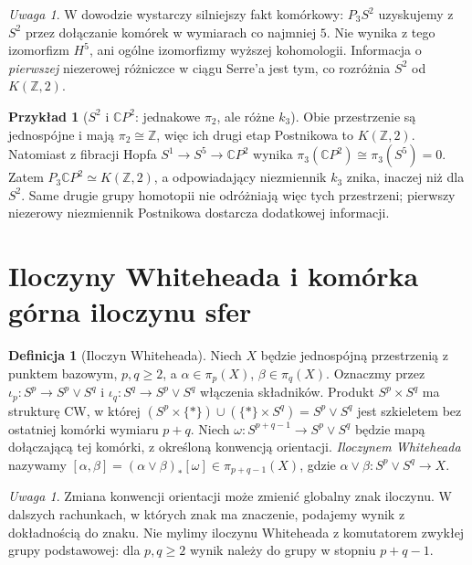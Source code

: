 \documentclass[11pt,a4paper,oneside]{report}
\newcommand{\C}{\mathbb{C}}
\newcommand{\Z}{\mathbb{Z}}
\theoremstyle{plain}
\theoremstyle{definition}
\newtheorem{definicja}[twierdzenie]{Definicja}
\newtheorem{przyklad}[twierdzenie]{Przykład}
\theoremstyle{remark}
\newtheorem{uwaga}[twierdzenie]{Uwaga}
\begin{document}
\begin{uwaga}
W dowodzie wystarczy silniejszy fakt komórkowy:
$P_3S^2$ uzyskujemy z $S^2$ przez dołączanie komórek
w wymiarach co najmniej $5$. Nie wynika z tego
izomorfizm $H^5$, ani ogólne izomorfizmy wyższej
kohomologii. Informacja o \emph{pierwszej} niezerowej
różniczce w ciągu Serre'a jest tym, co rozróżnia
$S^2$ od $K(\Z,2)$.
\end{uwaga}


\begin{przyklad}[\texorpdfstring{$S^2$}{S2} i
\texorpdfstring{$\C P^2$}{CP2}: jednakowe $\pi_2$,
ale różne $k_3$]
Obie przestrzenie są jednospójne i mają
$\pi_2\cong\Z$, więc ich drugi etap Postnikowa
to $K(\Z,2)$. Natomiast z fibracji Hopfa
$S^1\to S^5\to\C P^2$ wynika
$\pi_3(\C P^2)\cong\pi_3(S^5)=0$.
Zatem $P_3\C P^2\simeq K(\Z,2)$, a odpowiadający
niezmiennik $k_3$ znika, inaczej niż dla $S^2$.
Same drugie grupy homotopii nie odróżniają więc tych
przestrzeni; pierwszy niezerowy niezmiennik Postnikowa
dostarcza dodatkowej informacji.
\end{przyklad}

\section{Iloczyny Whiteheada i komórka górna iloczynu sfer}
\begin{definicja}[Iloczyn Whiteheada]
Niech $X$ będzie jednospójną przestrzenią z punktem
bazowym, $p,q\ge2$, a
$\alpha\in\pi_p(X)$, $\beta\in\pi_q(X)$.
Oznaczmy przez $\iota_p:S^p\to S^p\vee S^q$ i
$\iota_q:S^q\to S^p\vee S^q$ włączenia składników.
Produkt $S^p\times S^q$ ma strukturę CW, w której
$(S^p\times\{*\})\cup(\{*\}\times S^q)=S^p\vee S^q$
jest szkieletem bez ostatniej komórki wymiaru $p+q$.
Niech $\omega:S^{p+q-1}\to S^p\vee S^q$
będzie mapą dołączającą tej komórki, z określoną
konwencją orientacji. \emph{Iloczynem Whiteheada}
nazywamy
$[\alpha,\beta]=(\alpha\vee\beta)_*[\omega]
\in\pi_{p+q-1}(X)$, gdzie
$\alpha\vee\beta:S^p\vee S^q\to X$.
\end{definicja}

\begin{uwaga}
Zmiana konwencji orientacji może zmienić globalny znak
iloczynu. W dalszych rachunkach, w których znak ma
znaczenie, podajemy wynik z dokładnością do znaku.
Nie mylimy iloczynu Whiteheada z komutatorem
zwykłej grupy podstawowej: dla $p,q\ge2$ wynik
należy do grupy w stopniu $p+q-1$.
\end{uwaga}
\end{document}
